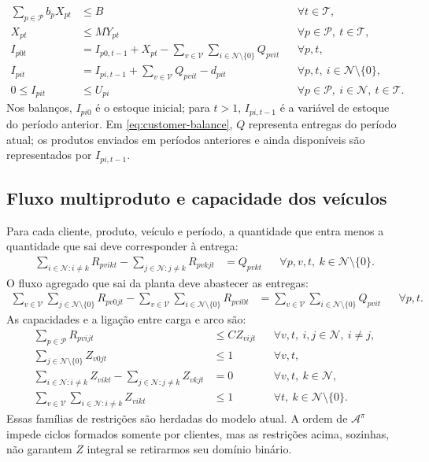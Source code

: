 \documentclass[11pt,a4paper]{article}
\newcommand{\N}{\mathcal{N}}
\newcommand{\Pset}{\mathcal{P}}
\newcommand{\Tset}{\mathcal{T}}
\newcommand{\Vset}{\mathcal{V}}
\newcommand{\A}{\mathcal{A}}
\begin{document}
\begin{align}
 \sum_{p\in\Pset} b_p X_{pt} &\le B && \forall t\in\Tset, \label{eq:prod-cap}\\
 X_{pt} &\le M Y_{pt} && \forall p\in\Pset,\ t\in\Tset, \label{eq:setup-link}\\
 I_{p0t} &= I_{p0,t-1}+X_{pt}-\sum_{v\in\Vset}\sum_{i\in\N\setminus\{0\}}Q_{pvit}
 && \forall p,t, \label{eq:plant-balance}\\
 I_{pit} &= I_{pi,t-1}+\sum_{v\in\Vset}Q_{pvit}-d_{pit}
 && \forall p,t,\ i\in\N\setminus\{0\}, \label{eq:customer-balance}\\
 0\le I_{pit} &\le U_{pi} && \forall p\in\Pset,\ i\in\N,\ t\in\Tset. \label{eq:inventory-bounds}
\end{align}
Nos balanços, $I_{pi0}$ é o estoque inicial; para $t>1$, $I_{pi,t-1}$ é a variável de estoque do período anterior. Em \eqref{eq:customer-balance}, $Q$ representa entregas do período atual; os produtos enviados em períodos anteriores e ainda disponíveis são representados por $I_{pi,t-1}$.

\subsection{Fluxo multiproduto e capacidade dos veículos}

Para cada cliente, produto, veículo e período, a quantidade que entra menos a quantidade que sai deve corresponder à entrega:
\begin{align}
 \sum_{i\in\N:i\ne k}R_{pvikt}-\sum_{j\in\N:j\ne k}R_{pvkjt}
 &= Q_{pvkt}
 && \forall p,v,t,\ k\in\N\setminus\{0\}. \label{eq:commodity-balance}
\end{align}
O fluxo agregado que sai da planta deve abastecer as entregas:
\begin{align}
 \sum_{v\in\Vset}\sum_{j\in\N\setminus\{0\}}R_{pv0jt}
 -\sum_{v\in\Vset}\sum_{i\in\N\setminus\{0\}}R_{pvi0t}
 &=\sum_{v\in\Vset}\sum_{i\in\N\setminus\{0\}}Q_{pvit}
 && \forall p,t. \label{eq:plant-flow}
\end{align}
As capacidades e a ligação entre carga e arco são:
\begin{align}
 \sum_{p\in\Pset}R_{pvijt} &\le C Z_{vijt}
 && \forall v,t,\ i,j\in\N,\ i\ne j, \label{eq:vehicle-cap}\\
 \sum_{j\in\N\setminus\{0\}}Z_{v0jt} &\le 1
 && \forall v,t, \label{eq:one-departure}\\
 \sum_{i\in\N:i\ne k}Z_{vikt}-\sum_{j\in\N:j\ne k}Z_{vkjt} &=0
 && \forall v,t,\ k\in\N, \label{eq:route-balance}\\
 \sum_{v\in\Vset}\sum_{i\in\N:i\ne k}Z_{vikt} &\le 1
 && \forall t,\ k\in\N\setminus\{0\}. \label{eq:one-visit}
\end{align}
Essas famílias de restrições são herdadas do modelo atual. A ordem de $\A^\pi$ impede ciclos formados somente por clientes, mas as restrições acima, sozinhas, não garantem $Z$ integral se retirarmos seu domínio binário.
\end{document}
